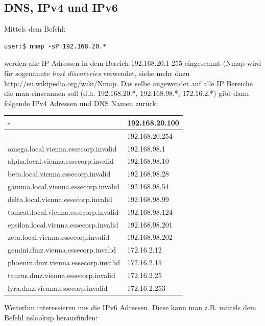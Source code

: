 \documentclass[12pt,a4paper,titlepage,oneside]{scrartcl}
\begin{document}
\subsection{DNS, IPv4 und IPv6}

\noindent
Mittels dem Befehl:

\begin{lstlisting}[caption=Nmap Host Discovery,label=code:beispiel1,style=simple]
user:$ nmap -sP 192.168.20.*
\end{lstlisting}

\noindent
werden alle IP-Adressen in dem Bereich 192.168.20.1-255 eingescannt (Nmap wird für sogenannte \emph{host discoveries} verwendet, siehe mehr dazu \url{http://en.wikipedia.org/wiki/Nmap}. Das selbe angewendet auf alle IP Bereiche die man einscannen soll (d.h. 192.168.20.*, 192.168.98.*, 172.16.2.*) gibt dann folgende IPv4 Adressen und DNS Namen zurück:

\begin{tabular}{ l | l }
\hline
  - & 192.168.20.100 \\ \hline
  - & 192.168.20.254 \\ \hline
omega.local.vienna.essecorp.invalid & 192.168.98.1 \\ \hline
alpha.local.vienna.essecorp.invalid &	192.168.98.10 \\ \hline
beta.local.vienna.essecorp.invalid &	192.168.98.28\\ \hline
gamma.local.vienna.essecorp.invalid	 & 192.168.98.54\\ \hline
delta.local.vienna.essecorp.invalid	& 192.168.98.99\\ \hline
tomcat.local.vienna.essecorp.invalid	& 192.168.98.124\\ \hline
epsilon.local.vienna.essecorp.invalid	& 192.168.98.201\\ \hline
zeta.local.vienna.essecorp.invalid	& 192.168.98.202\\ \hline
gemini.dmz.vienna.essecorp.invalid	& 172.16.2.12\\ \hline
phoenix.dmz.vienna.essecorp.invalid	& 172.16.2.15\\ \hline
taurus.dmz.vienna.essecorp.invalid	& 172.16.2.25\\ \hline
lyra.dmz.vienna.essecorp.invalid	& 172.16.2.253\\ \hline
\end{tabular}

\newpage

\noindent
Weiterhin interessieren uns die IPv6 Adressen. Diese kann man z.B. mittels dem Befehl nslookup herausfinden:
\end{document}
